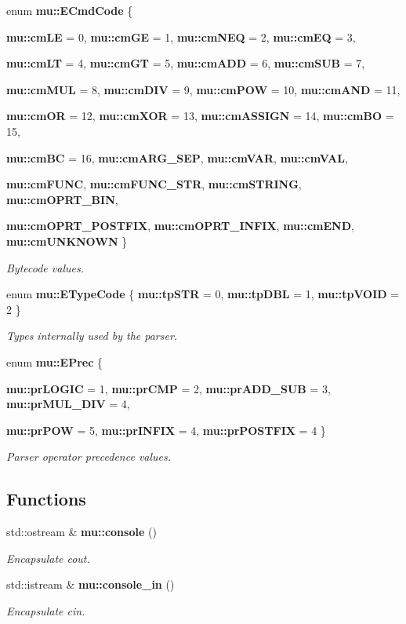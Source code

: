 \begin{CompactItemize}
\item 
enum {\bf mu::ECmdCode} \{ \par
{\bf mu::cmLE} =  0, 
{\bf mu::cmGE} =  1, 
{\bf mu::cmNEQ} =  2, 
{\bf mu::cmEQ} =  3, 
\par
{\bf mu::cmLT} =  4, 
{\bf mu::cmGT} =  5, 
{\bf mu::cmADD} =  6, 
{\bf mu::cmSUB} =  7, 
\par
{\bf mu::cmMUL} =  8, 
{\bf mu::cmDIV} =  9, 
{\bf mu::cmPOW} =  10, 
{\bf mu::cmAND} =  11, 
\par
{\bf mu::cmOR} =  12, 
{\bf mu::cmXOR} =  13, 
{\bf mu::cmASSIGN} =  14, 
{\bf mu::cmBO} =  15, 
\par
{\bf mu::cmBC} =  16, 
{\bf mu::cmARG\_\-SEP}, 
{\bf mu::cmVAR}, 
{\bf mu::cmVAL}, 
\par
{\bf mu::cmFUNC}, 
{\bf mu::cmFUNC\_\-STR}, 
{\bf mu::cmSTRING}, 
{\bf mu::cmOPRT\_\-BIN}, 
\par
{\bf mu::cmOPRT\_\-POSTFIX}, 
{\bf mu::cmOPRT\_\-INFIX}, 
{\bf mu::cmEND}, 
{\bf mu::cmUNKNOWN}
 \}
\begin{CompactList}\small\item\em Bytecode values. \item\end{CompactList}\item 
enum {\bf mu::ETypeCode} \{ {\bf mu::tpSTR} =  0, 
{\bf mu::tpDBL} =  1, 
{\bf mu::tpVOID} =  2
 \}
\begin{CompactList}\small\item\em Types internally used by the parser. \item\end{CompactList}\item 
enum {\bf mu::EPrec} \{ \par
{\bf mu::prLOGIC} =  1, 
{\bf mu::prCMP} =  2, 
{\bf mu::prADD\_\-SUB} =  3, 
{\bf mu::prMUL\_\-DIV} =  4, 
\par
{\bf mu::prPOW} =  5, 
{\bf mu::prINFIX} =  4, 
{\bf mu::prPOSTFIX} =  4
 \}
\begin{CompactList}\small\item\em Parser operator precedence values. \item\end{CompactList}\end{CompactItemize}
\subsection*{Functions}
\begin{CompactItemize}
\item 
std::ostream \& {\bf mu::console} ()
\begin{CompactList}\small\item\em Encapsulate cout. \item\end{CompactList}\item 
std::istream \& {\bf mu::console\_\-in} ()
\begin{CompactList}\small\item\em Encapsulate cin. \item\end{CompactList}\end{CompactItemize}


